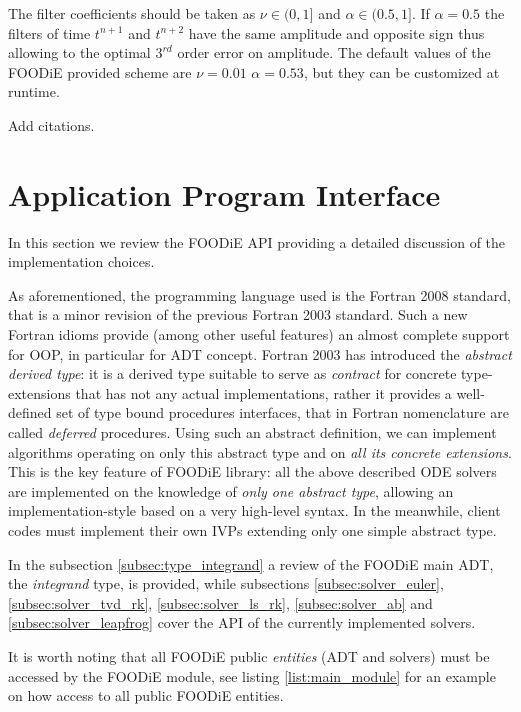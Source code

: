 \documentclass[pdftex,preprint,3p,times,numbers]{elsarticle}
\begin{document}
The filter coefficients should be taken as $\nu \in (0,1]$ and $\alpha \in (0.5,1]$. If $\alpha=0.5$ the filters of time $t^{n+1}$ and $t^{n+2}$ have the same amplitude and opposite sign thus allowing to the optimal $3^{rd}$ order error on amplitude. The default values of the FOODiE provided scheme are $\nu=0.01$ $\alpha=0.53$, but they can be customized at runtime.

{\color{red} Add citations.}

\clearpage

\section{Application Program Interface}\label{sec:API}

In this section we review the FOODiE API providing a detailed discussion of the implementation choices.

As aforementioned, the programming language used is the Fortran 2008 standard, that is a minor revision of the previous Fortran 2003 standard. Such a new Fortran idioms provide (among other useful features) an almost complete support for OOP, in particular for ADT concept. Fortran 2003 has introduced the \emph{abstract derived type}: it is a derived type suitable to serve as \emph{contract} for concrete type-extensions that has not any actual implementations, rather it provides a well-defined set of type bound procedures interfaces, that in Fortran nomenclature are called \emph{deferred} procedures. Using such an abstract definition, we can implement algorithms operating on only this abstract type and on \emph{all its concrete extensions}. This is the key feature of FOODiE library: all the above described ODE solvers are implemented on the knowledge of \emph{only one abstract type}, allowing an implementation-style based on a very high-level syntax. In the meanwhile, client codes must implement their own IVPs extending only one simple abstract type.

In the subsection \ref{subsec:type_integrand} a review of the FOODiE main ADT, the \emph{integrand} type, is provided, while subsections \ref{subsec:solver_euler}, \ref{subsec:solver_tvd_rk}, \ref{subsec:solver_ls_rk}, \ref{subsec:solver_ab} and \ref{subsec:solver_leapfrog} cover the API of the currently implemented solvers.

It is worth noting that all FOODiE public \emph{entities} (ADT and solvers) must be accessed by the FOODiE module, see listing \ref{list:main_module} for an example on how access to all public FOODiE entities.
\end{document}
